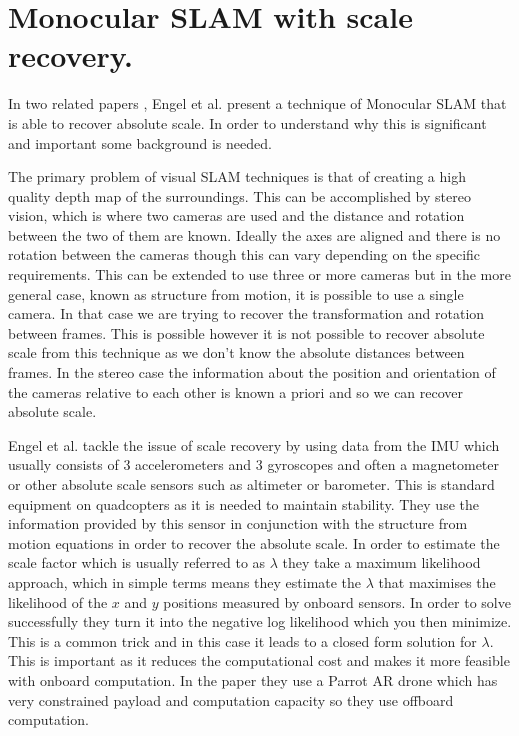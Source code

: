 \documentclass[]{../resources/final_report}
\begin{document}
\section{Monocular SLAM with scale recovery.}

In two related papers \cite{Engel:FigureFlying}\cite{Engel:Camera-basedNav}, Engel et al. present a 
technique of Monocular SLAM that is able to recover absolute scale. In order to understand why 
this is significant and important some background is needed.

The primary problem of visual SLAM techniques is that of creating a high quality depth map of the 
surroundings. This can be accomplished by stereo vision, which is where two cameras are used and the 
distance and rotation between the two of them are known. Ideally the axes are aligned and there is 
no rotation between the cameras though this can vary depending on the specific requirements.
This can be extended to use three or more cameras but in the more general case, known as structure 
from motion, it is possible to use a single camera. In that case we are trying to recover the 
transformation and rotation between frames. This is possible however it is not possible to recover 
absolute scale from this technique as we don't know the absolute distances between frames. In the 
stereo case the information about the position and orientation of the cameras relative to each other
is known a priori and so we can recover absolute scale.

Engel et al. tackle the issue of scale recovery by using data from the IMU which usually consists of 
3 accelerometers and 3 gyroscopes and often a magnetometer or other absolute scale sensors such as 
altimeter or barometer. This is standard equipment on quadcopters as it is needed to maintain stability. 
They use the information provided by this sensor in conjunction with the structure from motion 
equations in order to recover the absolute scale. In order to estimate the scale factor which is 
usually referred to as $\lambda$ they take a maximum likelihood approach, which in simple terms 
means they estimate the $\lambda$ that maximises the likelihood of the $x$ and $y$ positions 
measured by onboard sensors. In order to solve successfully they turn it into the negative log 
likelihood which you then minimize. This is a common trick and in this case it leads to a closed 
form solution for $\lambda$. This is important as it reduces the computational cost and makes it 
more feasible with onboard computation. In the paper they use a Parrot AR drone which has very 
constrained payload and computation capacity so they use offboard computation.
\end{document}
